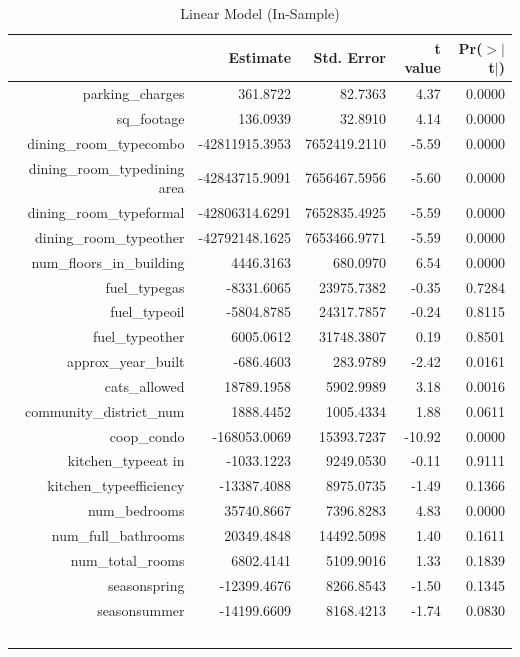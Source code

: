 \documentclass[12pt]{article}
\begin{document}
\begin{table}[ht]
\centering
\caption{Linear Model (In-Sample)} \label{linear_mod}
\begin{tabular}{rrrrr}
  \hline
 & Estimate & Std. Error & t value & Pr($>$$|$t$|$) \\ 
  \hline
parking\_charges & 361.8722 & 82.7363 & 4.37 & 0.0000 \\ 
  sq\_footage & 136.0939 & 32.8910 & 4.14 & 0.0000 \\ 
  dining\_room\_typecombo & -42811915.3953 & 7652419.2110 & -5.59 & 0.0000 \\ 
  dining\_room\_typedining area & -42843715.9091 & 7656467.5956 & -5.60 & 0.0000 \\ 
  dining\_room\_typeformal & -42806314.6291 & 7652835.4925 & -5.59 & 0.0000 \\ 
  dining\_room\_typeother & -42792148.1625 & 7653466.9771 & -5.59 & 0.0000 \\ 
  num\_floors\_in\_building & 4446.3163 & 680.0970 & 6.54 & 0.0000 \\ 
  fuel\_typegas & -8331.6065 & 23975.7382 & -0.35 & 0.7284 \\ 
  fuel\_typeoil & -5804.8785 & 24317.7857 & -0.24 & 0.8115 \\ 
  fuel\_typeother & 6005.0612 & 31748.3807 & 0.19 & 0.8501 \\ 
  approx\_year\_built & -686.4603 & 283.9789 & -2.42 & 0.0161 \\ 
  cats\_allowed & 18789.1958 & 5902.9989 & 3.18 & 0.0016 \\ 
  community\_district\_num & 1888.4452 & 1005.4334 & 1.88 & 0.0611 \\ 
  coop\_condo & -168053.0069 & 15393.7237 & -10.92 & 0.0000 \\ 
  kitchen\_typeeat in & -1033.1223 & 9249.0530 & -0.11 & 0.9111 \\ 
  kitchen\_typeefficiency & -13387.4088 & 8975.0735 & -1.49 & 0.1366 \\ 
  num\_bedrooms & 35740.8667 & 7396.8283 & 4.83 & 0.0000 \\ 
  num\_full\_bathrooms & 20349.4848 & 14492.5098 & 1.40 & 0.1611 \\ 
  num\_total\_rooms & 6802.4141 & 5109.9016 & 1.33 & 0.1839 \\ 
  seasonspring & -12399.4676 & 8266.8543 & -1.50 & 0.1345 \\ 
  seasonsummer & -14199.6609 & 8168.4213 & -1.74 & 0.0830 \\ 
$$
\end{tabular}
\end{table}
\end{document}
